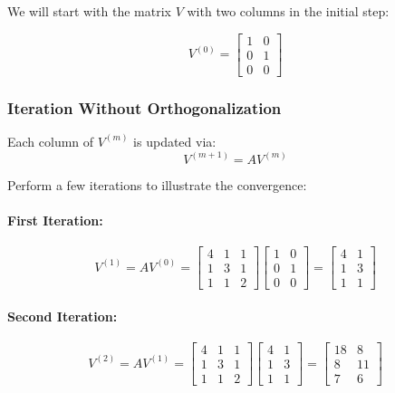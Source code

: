 \documentclass[12pt]{article}
\begin{document}
We will start with the matrix $V$ with two columns in the initial step:

$$
V^{(0)} = \begin{bmatrix} 1 & 0 \\ 0 & 1 \\ 0 & 0 \end{bmatrix}
$$

\subsubsection*{Iteration Without Orthogonalization}

Each column of $ V^{(m)} $ is updated via:
$$
V^{(m+1)} = A V^{(m)}
$$

Perform a few iterations to illustrate the convergence:

\paragraph{First Iteration:}

$$
V^{(1)} = A V^{(0)} = \begin{bmatrix} 4 & 1 & 1 \\ 1 & 3 & 1 \\ 1 & 1 & 2 \end{bmatrix} \begin{bmatrix} 1 & 0 \\ 0 & 1 \\ 0 & 0 \end{bmatrix} = \begin{bmatrix} 4 & 1 \\ 1 & 3 \\ 1 & 1 \end{bmatrix}
$$

\paragraph{Second Iteration:}

$$
V^{(2)} = A V^{(1)} = \begin{bmatrix} 4 & 1 & 1 \\ 1 & 3 & 1 \\ 1 & 1 & 2 \end{bmatrix} \begin{bmatrix} 4 & 1 \\ 1 & 3 \\ 1 & 1 \end{bmatrix} = \begin{bmatrix} 18 & 8 \\ 8 & 11 \\ 7 & 6 \end{bmatrix}
$$
\end{document}
